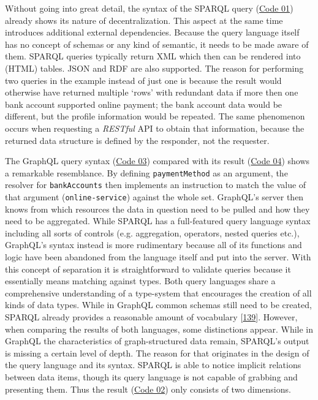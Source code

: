 \documentclass[12pt,english,a4paper,titlepage,cleardoublepage=empty,dottedtoc]{report}
\begin{document}
Without going into great detail, the syntax of the SPARQL query
(\protect\hyperlink{code-01_sparql-query}{Code 01}) already shows its
nature of decentralization. This aspect at the same time introduces
additional external dependencies. Because the query language itself has
no concept of schemas or any kind of semantic, it needs to be made aware
of them. SPARQL queries typically return XML which then can be rendered
into (HTML) tables. JSON and RDF are also supported. The reason for
performing two queries in the example instead of just one is because the
result would otherwise have returned multiple `rows' with redundant data
if more then one bank account supported online payment; the bank account
data would be different, but the profile information would be repeated.
The same phenomenon occurs when requesting a \emph{RESTful} API to
obtain that information, because the returned data structure is defined
by the responder, not the requester.

The GraphQL query syntax (\protect\hyperlink{code-03_graphql-query}{Code
03}) compared with its result
(\protect\hyperlink{code-04_graphql-query-result}{Code 04}) shows a
remarkable resemblance. By defining \texttt{paymentMethod} as an
argument, the resolver for \texttt{bankAccounts} then implements an
instruction to match the value of that argument
(\texttt{\textquotesingle{}online-service\textquotesingle{}}) against
the whole set. GraphQL's server then knows from which resources the data
in question need to be pulled and how they need to be aggregated. While
SPARQL has a full-featured query language syntax including all sorts of
controls (e.g. aggregation, operators, nested queries etc.), GraphQL's
syntax instead is more rudimentary because all of its functions and
logic have been abandoned from the language itself and put into the
server. With this concept of separation it is straightforward to
validate queries because it essentially means matching against types.
Both query languages share a comprehensive understanding of a
type-system that encourages the creation of all kinds of data types.
While in GraphQL common schemas still need to be created, SPARQL already
provides a reasonable amount of vocabulary
{[}\protect\hyperlink{ref-web_w3c-tr_rdf-schemas}{139}{]}. However, when
comparing the results of both languages, some distinctions appear. While
in GraphQL the characteristics of graph-structured data remain, SPARQL's
output is missing a certain level of depth. The reason for that
originates in the design of the query language and its syntax. SPARQL is
able to notice implicit relations between data items, though its query
language is not capable of grabbing and presenting them. Thus the result
(\protect\hyperlink{code-02_sparql-query-results}{Code 02}) only
consists of two dimensions.
\end{document}
